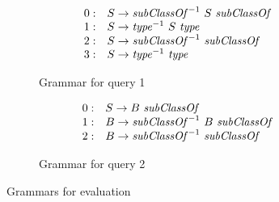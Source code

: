 \begin{figure*}%
   \begin{center}
   \centering
   \begin{subfigure}[b]{0.4\textwidth}

   \[
\begin{array}{rl}
   0: & S \rightarrow \text{\textit{subClassOf}}^{-1} \ S \ \text{\textit{subClassOf}} \\ 
   1: & S \rightarrow \text{\textit{type}}^{-1} \ S \ \text{\textit{type}} \\ 
   2: & S \rightarrow \text{\textit{subClassOf}}^{-1} \ \text{\textit{subClassOf}} \\ 
   3: & S \rightarrow \text{\textit{type}}^{-1} \ \text{\textit{type}} \\ 
\end{array}
\]
   \caption{Grammar for query 1}
   \label{grammarQ1}
   \end{subfigure}
   \hspace{2em}
   \begin{subfigure}[b]{0.4\textwidth}
   \[
\begin{array}{rl}
   0: & S \rightarrow B \ \text{\textit{subClassOf}} \\ 
   1: & B \rightarrow \text{\textit{subClassOf}}^{-1} \ B \ \text{\textit{subClassOf}} \\
   2: & B \rightarrow \text{\textit{subClassOf}}^{-1} \ \text{\textit{subClassOf}} \\ 
\end{array}
\]
   \caption{Grammar for query 2}
   \label{grammarQ2}        
   \end{subfigure}
   \end{center}
   \caption{Grammars for evaluation}
    \label{GrammarsForEvaluation}
\end{figure*}



